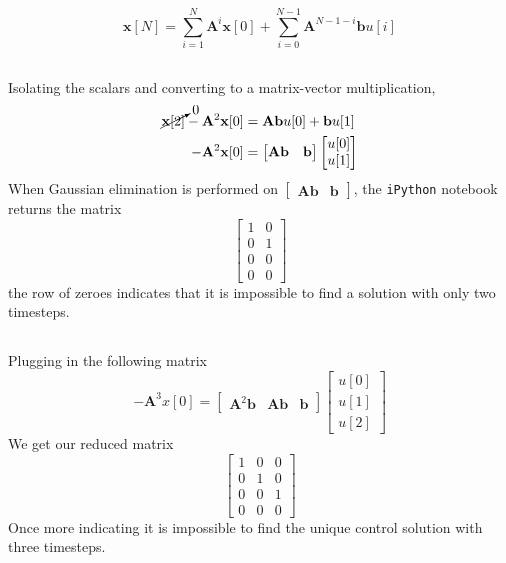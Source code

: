 \documentclass[]{article}
\numberwithin{equation}{section}
\begin{document}
\begin{equation}
	\mathbf{x}[N] = \sum_{i = 1}^{N} \mathbf{A}^i \mathbf{x}[0] + \sum_{i = 0}^{N - 1} \mathbf{A}^{N - 1 - i} \mathbf{b} u[i]
\end{equation}

\subsection{}

Isolating the scalars and converting to a matrix-vector multiplication, 
\begin{align}
	\cancelto{0}{\mathbf{x}[2]} - \mathbf{A}^2 \mathbf{x}[0] &= \mathbf{Ab} u[0] + \mathbf{b} u[1] \\
	-\mathbf{A}^2 \mathbf{x}[0] &= 
	\begin{bmatrix}
	\mathbf{Ab} & \mathbf{b}
	\end{bmatrix}
	\begin{bmatrix}
	u[0] \\
	u[1]
	\end{bmatrix}\label{eq:5-d}
\end{align}
When Gaussian elimination is performed on \(\begin{bmatrix}
\mathbf{Ab} & \mathbf{b}
\end{bmatrix}\), the \texttt{iPython} notebook returns the matrix
\begin{equation}
	\begin{bmatrix}
	1 & 0 \\
	0 & 1 \\
	0 & 0 \\
	0 & 0
	\end{bmatrix}
\end{equation}
the row of zeroes indicates that it is impossible to find a solution with only two timesteps. 

\subsection{}

Plugging in the following matrix 
\begin{equation}
	-\mathbf{A}^3 x[0] = 
	\begin{bmatrix}
	\mathbf{A}^2 \mathbf{b} & \mathbf{Ab} & \mathbf{b}
	\end{bmatrix}
	\begin{bmatrix}
	u[0] \\
	u[1] \\
	u[2]
	\end{bmatrix}
\end{equation}
We get our reduced matrix
\begin{equation}
	\begin{bmatrix}
	1 & 0 & 0 \\
	0 & 1 & 0 \\
	0 & 0 & 1 \\
	0 & 0 & 0
	\end{bmatrix}
\end{equation}
Once more indicating it is impossible to find the unique control solution with three timesteps. 
\end{document}
